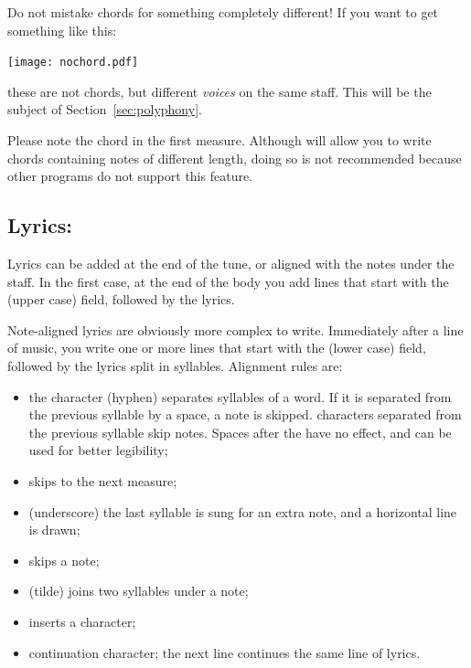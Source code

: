 \documentclass[a4paper,fullpage,12pt]{book}
\begin{document}

\begin{warn}

  Do not mistake chords for something completely different! If you
  want to get something like this:
  
  \texttt{[image: nochord.pdf]}
  
  these are not chords, but different \emph{voices} on the same staff.
  This will be the subject of Section~\ref{sec:polyphony}.

\end{warn}

Please note the chord in the first measure. Although \abcm{} will
allow you to write chords containing notes of different length, doing
so is not recommended because other \ABC{} programs do not support
this feature.


\subsection{Lyrics: }
\label{sec:lyrics}

Lyrics can be added at the end of the tune, or aligned with the notes
under the staff. In the first case, at the end of the body you add
lines that start with the  (upper case) field, followed by
the lyrics.

Note-aligned lyrics are obviously more complex to write. Immediately
after a line of music, you write one or more lines that start with the
 (lower case) field, followed by the lyrics split in
syllables. Alignment rules are:

\begin{itemize}
  
  \item the \car{-} character (hyphen) separates syllables of a word.
  If it is separated from the previous syllable by a space, a note is
  skipped.  \car{-} characters separated from the previous
  syllable skip  notes. Spaces after the \car{-} have no
  effect, and can be used for better legibility;
  
  \item \car{\textbar} skips to the next measure;
  
  \item \car{\_} (underscore) the last syllable is sung for an extra
  note, and a horizontal line is drawn;
  
  \item \car{*} skips a note;
  
  \item \car{\textasciitilde} (tilde) joins two syllables under a note;
  
  \item \car{\bl{}-} inserts a \car{-} character;
  
  \item \car{\textbackslash} continuation character; the next 
  line continues the same line of lyrics.
  
\end{itemize}
\end{document}
